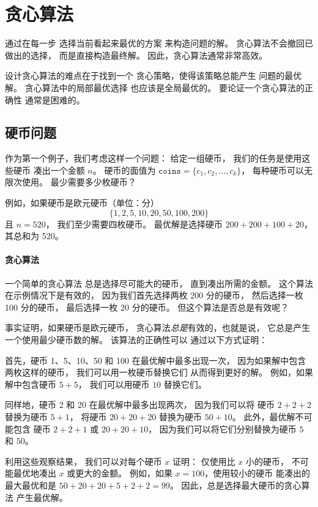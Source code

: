 \chapter{贪心算法}


通过在每一步
选择当前看起来最优的方案
来构造问题的解。
贪心算法不会撤回已做出的选择，
而是直接构造最终解。
因此，贪心算法通常非常高效。

设计贪心算法的难点在于找到一个
贪心策略，使得该策略总能产生
问题的最优解。
贪心算法中的局部最优选择
也应该是全局最优的。
要论证一个贪心算法的正确性
通常是困难的。

\section{硬币问题}

作为第一个例子，我们考虑这样一个问题：
给定一组硬币，
我们的任务是使用这些硬币
凑出一个金额 $n$。
硬币的面值为
$\texttt{coins}=\{c_1,c_2,\ldots,c_k\}$，
每种硬币可以无限次使用。
最少需要多少枚硬币？

例如，如果硬币是欧元硬币（单位：分）
\[\{1,2,5,10,20,50,100,200\}\]
且 $n=520$，
我们至少需要四枚硬币。
最优解是选择硬币
$200+200+100+20$，其总和为 520。

\subsubsection{贪心算法}

一个简单的贪心算法
总是选择尽可能大的硬币，
直到凑出所需的金额。
这个算法在示例情况下是有效的，
因为我们首先选择两枚 200 分的硬币，
然后选择一枚 100 分的硬币，
最后选择一枚 20 分的硬币。
但这个算法是否总是有效呢？

事实证明，如果硬币是欧元硬币，
贪心算法\emph{总是}有效的，也就是说，
它总是产生一个使用最少硬币数的解。
该算法的正确性可以
通过以下方式证明：

首先，硬币 1、5、10、50 和 100
在最优解中最多出现一次，
因为如果解中包含两枚这样的硬币，
我们可以用一枚硬币替换它们
从而得到更好的解。
例如，如果解中包含硬币 $5+5$，
我们可以用硬币 $10$ 替换它们。

同样地，硬币 2 和 20
在最优解中最多出现两次，
因为我们可以将
硬币 $2+2+2$ 替换为硬币 $5+1$，
将硬币 $20+20+20$ 替换为硬币 $50+10$。
此外，最优解不可能包含
硬币 $2+2+1$ 或 $20+20+10$，
因为我们可以将它们分别替换为硬币 $5$ 和 $50$。

利用这些观察结果，
我们可以对每个硬币 $x$ 证明：
仅使用比 $x$ 小的硬币，
不可能最优地凑出
$x$ 或更大的金额。
例如，如果 $x=100$，使用较小的硬币
能凑出的最大最优和是 $50+20+20+5+2+2=99$。
因此，总是选择最大硬币的贪心算法
产生最优解。

